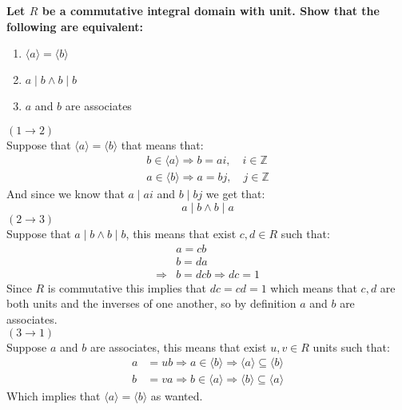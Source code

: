 \documentclass{article}
\theoremstyle{plain}
\newcommand{\Z}{\mathbb{Z}}
\begin{document}
    \textbf{Let $R$ be a commutative integral domain with unit.
	Show that the following are equivalent:}
	\begin{enumerate}
		\item $\langle a \rangle = \langle b \rangle$
		\item $a\mid b \land b\mid b$
		\item $a$ and $b$ are associates
	\end{enumerate}
	\underline{$(1 \to 2)$} \\
	Suppose that $\langle a \rangle = \langle b \rangle$ that means that:
	\begin{align*}
		b \in \langle a \rangle \Rightarrow b = ai,\quad i\in\Z \\
		a \in \langle b \rangle \Rightarrow a = bj,\quad j\in\Z
	\end{align*}
	And since we know that $a \mid ai$ and $b \mid bj$ we get that:
	\[
		a\mid b \land b\mid a
	\]
	\underline{$(2 \to 3)$} \\
	Suppose that $a\mid b \land b\mid b$, this means that exist $c,d\in R$ 
	such that:
	\begin{align*}
		&a = cb \\
		&b = da \\
		\Rightarrow &b = dcb \Rightarrow dc = 1
	\end{align*}
	Since $R$ is commutative this implies that $dc = cd = 1$ which means
	that $c,d$ are both units and the inverses of one another, so by
	definition $a$ and $b$ are associates. \\
	\underline{$(3 \to 1)$} \\
	Suppose $a$ and $b$ are associates, this means that exist $u,v\in R$ units
	such that:
	\begin{align*}
		a &= ub \Rightarrow a\in \langle b \rangle \Rightarrow 
		\langle a \rangle \subseteq \langle b \rangle \\
		b &= va \Rightarrow b\in \langle a \rangle \Rightarrow 
		\langle b \rangle \subseteq \langle a \rangle
	\end{align*}
	Which implies that $\langle a \rangle = \langle b \rangle$ as wanted.
		
	\newpage
	
\end{document}
